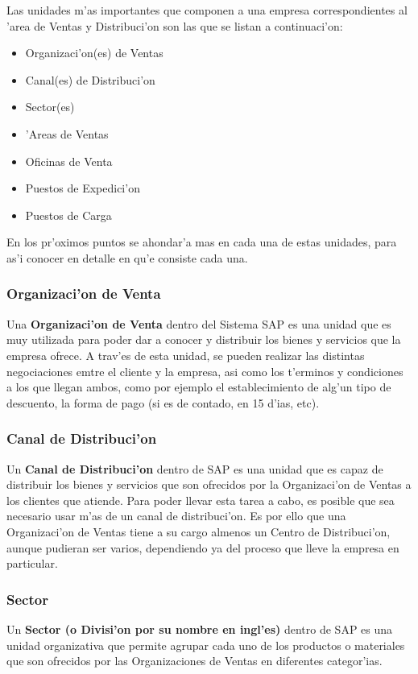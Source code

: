 Las unidades m'as importantes que componen a una empresa correspondientes al 'area de Ventas y Distribuci'on son las que se listan a continuaci'on:

\begin{itemize}
\item Organizaci'on(es) de Ventas
\item Canal(es) de Distribuci'on
\item Sector(es)
\item 'Areas de Ventas
\item Oficinas de Venta
\item Puestos de Expedici'on
\item Puestos de Carga
\end{itemize}

	En los pr'oximos puntos se ahondar'a mas en cada una de estas unidades, para as'i conocer en detalle en qu'e consiste cada una.
	
\subsubsection{Organizaci'on de Venta}
	Una \textbf{Organizaci'on de Venta} dentro del Sistema SAP es una unidad que es muy utilizada para poder dar a conocer y distribuir los bienes y servicios que la empresa ofrece. A trav'es de esta unidad, se pueden realizar las distintas negociaciones emtre el cliente y la empresa, asi como los t'erminos y condiciones a los que llegan ambos, como por ejemplo el establecimiento de alg'un tipo de descuento, la forma de pago (si es de contado, en 15 d'ias, etc). 
	
\subsubsection{Canal de Distribuci'on}
	Un \textbf{Canal de Distribuci'on} dentro de SAP es una unidad que es capaz de distribuir los bienes y servicios que son ofrecidos por la Organizaci'on de Ventas a los clientes que atiende.
	Para poder llevar esta tarea a cabo, es posible que sea necesario usar m'as de un canal de distribuci'on. Es por ello que una Organizaci'on de Ventas tiene a su cargo almenos un Centro de Distribuci'on, aunque pudieran ser varios, dependiendo ya del proceso que lleve la empresa en particular.

\subsubsection{Sector}
	Un \textbf{Sector (o Divisi'on por su nombre en ingl'es)} dentro de SAP es una unidad organizativa que permite agrupar cada uno de los productos o materiales que son ofrecidos por las Organizaciones de Ventas en diferentes categor'ias. 
	
